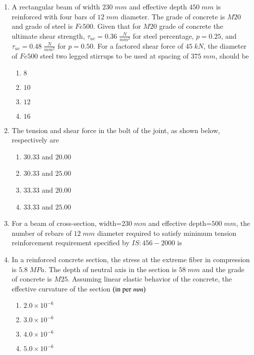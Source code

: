 \documentclass[journal,12pt,onecolumn]{IEEEtran}
\theoremstyle{remark}
\begin{document}
\begin{enumerate}[start=27]
\item A rectangular beam of width  $230\;mm$ and effective depth  $450\;mm$ is reinforced with four bars of $12\;mm$ diameter. The grade of concrete is $M20$ and grade of steel is $Fe500$. Given that for $M20$ grade of concrete the ultimate shear strength, $\tau_{uc}=0.36\;\frac{N}{mm^2}$ for steel percentage, $p=0.25$, and $\tau_{uc}=0.48\;\frac{N}{mm^2}$ for $p=0.50$. For a factored shear force of $45\;kN$, the diameter  of $Fe500$ steel two legged stirrups to be used at spacing of $375\;mm$, should be
\begin{enumerate}
    \item $8$
    \item $10$
    \item $12$
    \item $16$
\end{enumerate}
\item The tension and shear force  in the bolt of the joint, as shown below, respectively are
	
\begin{enumerate}
    \item $30.33$ and $20.00$
    \item $30.33$ and $25.00$
    \item $33.33$ and $20.00$
    \item $33.33$ and $25.00$
\end{enumerate}
\item For a beam of cross-section, width=$230\;mm$ and effective depth=$500\;mm$, the number of rebars of $12\;mm$ diameter required to satisfy 
minimum tension reinforcement requirement specified by $IS:456-2000$  is \underline{\hspace{2cm}}
\item In a reinforced concrete section, the stress at the extreme fiber in compression is $5.8\;MPa$. The depth of neutral axis in the section is $58\;mm$ and the grade of concrete is $M25$. Assuming linear elastic behavior of the concrete, the effective curvature of the section $\left(\text{in per}\;mm\right) $
\begin{enumerate}
    \item $2.0 \times 10^{-6}$
    \item $3.0 \times 10^{-6}$
    \item $4.0 \times 10^{-6}$
    \item $5.0 \times 10^{-6}$
\end{enumerate}

\end{enumerate}
\end{document}
